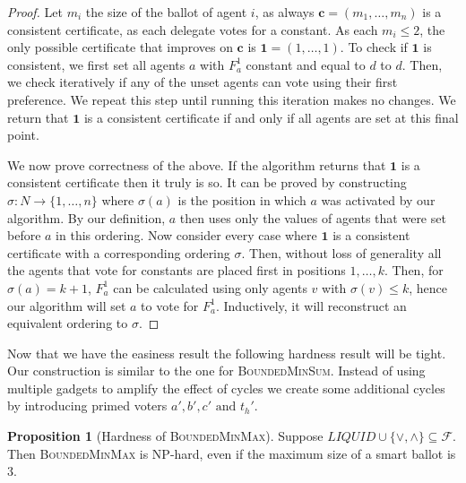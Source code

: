 \documentclass[11pt,a4paper, titlepage]{article}
\theoremstyle{definition}
\newtheorem{proposition}[theorem]{Proposition}
\let\vec\mathbf
\newcommand{\BMS}{\textsc{BoundedMinSum}}
\begin{document}
\begin{proof}
    Let $m_i$ the size of the ballot of agent $i$, as always $\vec{c} = (m_1, \ldots, m_n)$ is a consistent certificate, as each delegate votes for a constant.
    As each $m_i \leq 2$, the only possible certificate that improves on $\vec{c}$ is $\vec{1} = (1, \ldots, 1)$.
    To check if $\vec{1}$ is consistent, we first set all agents $a$ with $F_a^1$ constant and equal to $d$ to $d$.
    Then, we check iteratively if any of the unset agents can vote using their first preference.
    We repeat this step until running this iteration makes no changes.
    We return that $\vec{1}$ is a consistent certificate if and only if all agents are set at this final point.

    We now prove correctness of the above.
    If the algorithm returns that $\vec{1}$ is a consistent certificate then it truly is so. 
    It can be proved by constructing $\sigma \colon N \longrightarrow \{1,\ldots, n\}$ where $\sigma(a)$ is the position in which $a$ was activated by our algorithm.
    By our definition, $a$ then uses only the values of agents that were set before $a$ in this ordering.
    Now consider every case where $\vec{1}$ is a consistent certificate with a corresponding ordering $\sigma$.
    Then, without loss of generality all the agents that vote for constants are placed first in positions $1, \ldots, k$.
    Then, for $\sigma(a) = k+1$, $F_a^{1}$ can be calculated using only agents $v$ with $\sigma(v) \leq k$, hence our algorithm will set $a$ to vote for $F_a^1$. Inductively, it will reconstruct an equivalent ordering to $\sigma$.

\end{proof}

Now that we have the easiness result the following hardness result will be tight.
Our construction is similar to the one for \BMS.
Instead of using multiple gadgets to amplify the effect of cycles we create some additional cycles by introducing primed voters $a', b', c' \text{ and } t_h'$.

\begin{proposition}[Hardness of \textsc{BoundedMinMax}]
    Suppose $\mathit{LIQUID} \cup \{\lor, \land\} \subseteq \mathcal{F}$. Then \textsc{BoundedMinMax} is NP-hard, even if the maximum size of a smart ballot is 3.    
\end{proposition}
\end{document}

